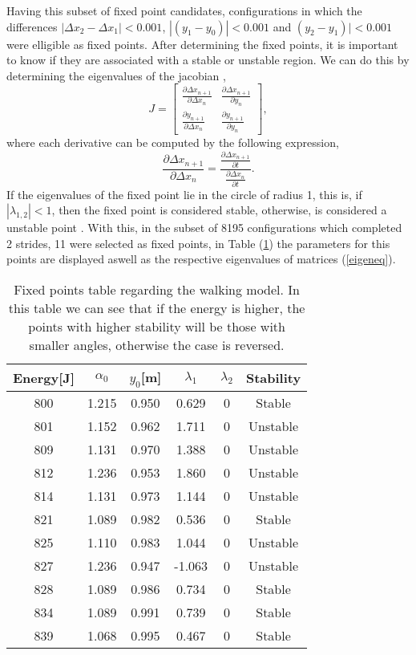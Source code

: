 Having this subset of fixed point candidates, configurations in which the differences $|\Delta x_2-\Delta x_1|< 0.001$, $|(y_1-y_0)|<0.001$ and $(y_2-y_1)|<0.001$ were elligible as fixed points. After determining the fixed points, it is important to know if they are associated with a stable or unstable region. We can do this by determining the eigenvalues of the jacobian \cite{Seyfarth2006},
\begin{equation}
 J= \begin{bmatrix}
    \frac{\partial \Delta x_{n+1}}{\partial \Delta x_{n}} & \frac{\partial \Delta x_{n+1}}{\partial  y_{n}}\\
     \frac{\partial  y_{n+1}}{\partial \Delta x_{n}} & \frac{\partial y_{n+1}}{\partial  y_{n}}
  \end{bmatrix},
  \label{eigeneq}
  \end{equation}
\noindent where each derivative can be computed by the following expression,
\begin{equation}
    \frac{\partial \Delta x_{n+1}}{\partial \Delta x_{n}}=  \frac{\frac{\partial \Delta x_{n+1}}{\partial t}}{\frac{\partial \Delta x_{n}}{\partial t}}. 
\end{equation}
If the eigenvalues of the fixed point lie in the circle of radius 1, this is, if $|\lambda_{1,2}|<1$, then the fixed point is considered stable, otherwise, is considered a unstable point \cite{Strogatz2001}. With this, in the subset of 8195 configurations which completed 2 strides, 11 were selected as fixed points, in Table (\ref{tabela}) the parameters for this points are displayed aswell as the respective eigenvalues of matrices (\ref{eigeneq}).

\begin{table}[H]
 \centering
\begin{tabular}{c|c|c|c|c|c}
Energy{[}J{]} &  $\alpha_0$ & $y_0${[}m{]} & $\lambda_1$ & $\lambda_2$ & Stability \\ \hline
800 & 1.215 & 0.950 & 0.629 & 0 & Stable \\
801 & 1.152 & 0.962 & 1.711 & 0 & Unstable \\
809 & 1.131 & 0.970 & 1.388 & 0 & Unstable \\
812 & 1.236 & 0.953 & 1.860 & 0 & Unstable \\
814 & 1.131 & 0.973 & 1.144 & 0 & Unstable \\
821 & 1.089 & 0.982 & 0.536 & 0 & Stable \\
825 & 1.110 & 0.983 & 1.044 & 0 & Unstable \\
827 & 1.236 & 0.947 & -1.063 & 0 & Unstable \\
828 & 1.089 & 0.986 & 0.734 & 0 & Stable \\
834 & 1.089 & 0.991 & 0.739 & 0 & Stable \\
839 & 1.068 & 0.995 & 0.467 & 0 & Stable
\end{tabular}
\caption{Fixed points table regarding the walking model. In this table we can see that if the energy is higher, the points with higher stability will be those with smaller angles, otherwise the case is reversed.}
\label{tabela}
\end{table}

